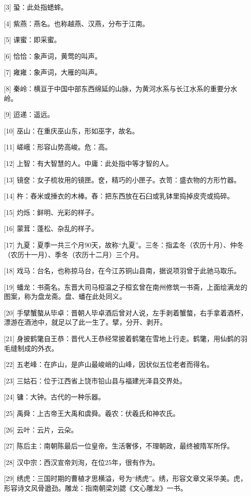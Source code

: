 \documentclass[12pt,UTF8]{ctexbook}
\begin{document}
[3] 蛩：此处指蟋蟀。

[4] 紫燕：燕名。也称越燕、汉燕，分布于江南。

[5] 课蜜：即采蜜。

[6] 恰恰：象声词，黄莺的叫声。

[7] 雍雍：象声词，大雁的叫声。

[8] 秦岭：横亘于中国中部东西绵延的山脉，为黄河水系与长江水系的重要分水岭。

[9] 迢递：遥远。

[10] 巫山：在重庆巫山东，形如巫字，故名。

[11] 嵯峨：形容山势高峻。危：高。

[12] 上智：有大智慧的人。中庸：此处指中等才智的人。

[13] 镜奁：女子梳妆用的镜匣。奁，精巧的小匣子。衣笥：盛衣物的方形竹器。

[14] 杵：舂米或捶衣的木棒。舂：把东西放在石臼或乳钵里捣掉皮壳或捣碎。

[15] 灼烁：鲜明、光彩的样子。

[16] 蒙茸：蓬松、杂乱的样子。

[17] 九夏：夏季一共三个月90天，故称“九夏”。三冬：指孟冬（农历十月）、仲冬（农历十一月）、季冬（农历十二月）三个月。

[18] 戏马：台名，也称掠马台，在今江苏铜山县南，据说项羽曾于此驰马取乐。

[19] 蟠龙：书斋名。东晋大司马桓温之子桓玄曾在南州修筑一书斋，上面绘满龙的图案，称为盘龙斋。盘、蟠在此处同义。

[20] 手擘蟹螯从毕卓：晋朝人毕卓酒后曾对人说，左手剥着蟹螫，右手拿着酒杯，漂游在酒池中，就足以了此一生了。擘，分开、剥开。

[21] 身披鹤氅自王恭：晋代人王恭经常披着鹤氅在雪地上行走。鹤氅，用仙鹤的羽毛缝制成的外衣。

[22] 五老峰：在庐山，是庐山最峻峭的山峰，因状似五位老者而得名。

[23] 三姑石：位于江西省上饶市铅山县与福建光泽县交界处。

[24] 镛：大钟。古代的一种乐器。

[25] 禹舜：上古帝王大禹和虞舜。羲农：伏羲氏和神农氏。

[26] 云叶：云片，云朵。

[27] 陈后主：南朝陈最后一位皇帝。生活奢侈，不理朝政，最终被隋军所俘。

[28] 汉中宗：西汉宣帝刘洵，在位25年，很有作为。

[29] 绣虎：三国时期的曹植才思横溢，号为“绣虎”。绣，形容文章文采华美。虎，形容诗文风骨遒劲。雕龙：指南朝梁刘勰《文心雕龙》一书。
\end{document}
